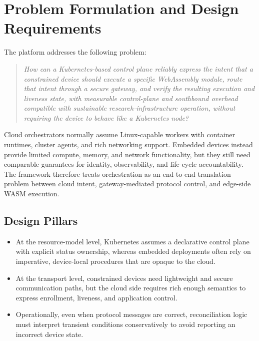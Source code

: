 \section{Problem Formulation and Design Requirements}\label{sec:problem}

The platform addresses the following problem:
\begin{quote}
\emph{How can a Kubernetes-based control plane reliably express the intent that a constrained device should execute a specific WebAssembly module, route that intent through a secure gateway, and verify the resulting execution and liveness state, with measurable control-plane and southbound overhead compatible with sustainable research-infrastructure operation, without requiring the device to behave like a Kubernetes node?}
\end{quote}

Cloud orchestrators normally assume Linux-capable workers with container runtimes, cluster agents, and rich networking support. Embedded devices instead provide limited compute, memory, and network functionality, but they still need comparable guarantees for identity, observability, and life-cycle accountability. The framework therefore treats orchestration as an end-to-end translation problem between cloud intent, gateway-mediated protocol control, and edge-side WASM execution.

\subsection{Design Pillars}

\begin{itemize}
    \item At the resource-model level, Kubernetes assumes a declarative control plane with explicit status ownership, whereas embedded deployments often rely on imperative, device-local procedures that are opaque to the cloud.
    \item At the transport level, constrained devices need lightweight and secure communication paths, but the cloud side requires rich enough semantics to express enrollment, liveness, and application control.
    \item Operationally, even when protocol messages are correct, reconciliation logic must interpret transient conditions conservatively to avoid reporting an incorrect device state.
\end{itemize}
  

